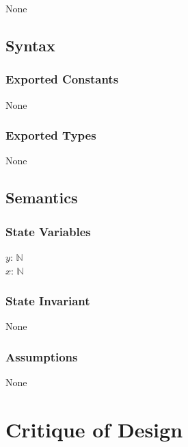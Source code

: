\documentclass[12pt]{article}
\begin{document}
None

\subsection* {Syntax}

\subsubsection* {Exported Constants}

None

\subsubsection* {Exported Types}

None

\subsection* {Semantics}

\subsubsection* {State Variables}

$\mathit{y}$: $\mathbb{N}$\\
$\mathit{x}$: $\mathbb{N}$

\subsubsection* {State Invariant}

None

\subsubsection* {Assumptions}

None

\section*{Critique of Design}
\end{document}

